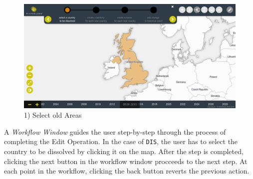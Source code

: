 \vspace{1em}
\begin{minipage}[t]{0.47\textwidth}

  \begin{figure}[H]
    \centering
    \includegraphics[width=1.0\textwidth]{graphics/development/user_interface_design_process/3_select_old_areas.png}
    \caption{1) Select old Areas}
    \label{fig:final_3_select_old_areas}
  \end{figure}

  A \emph{Workflow Window} guides the user step-by-step through the process of completing the Edit Operation. In the case of \texttt{DIS}, the user has to select the country to be dissolved by clicking it on the map. After the step is completed, clicking the next button in the workflow window procceeds to the next step. At each point in the workflow, clicking the back button reverts the previous action.

\end{minipage}    %
\hspace{1.5em}    %
